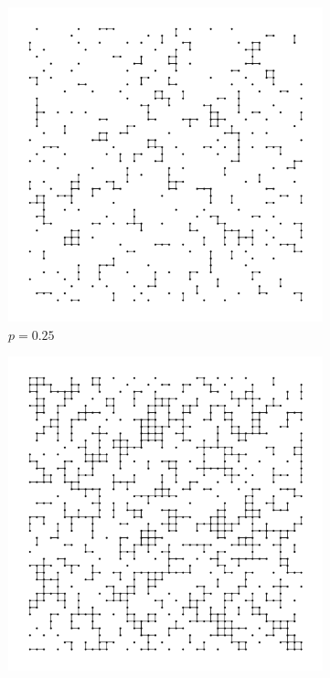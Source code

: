 \begin{figure}[p]
  \centering
  \begin{subfigure}[b]{0.45\textwidth}
    \centering
    \includegraphics[width=\textwidth]{1/percolation1}
    \caption{$p=0.25$}
    \label{fig:p=0.25}
  \end{subfigure}
  \hfill
  \begin{subfigure}[b]{0.45\textwidth}
    \centering
    \includegraphics[width=\textwidth]{1/percolation2}

\end{subfigure}
\end{figure}
